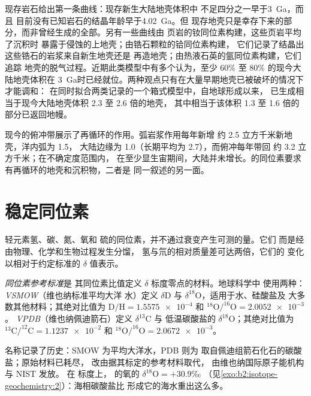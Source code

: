 现存岩石给出第一条曲线：现存新生大陆地壳体积中
不足四分之一早于\qty{3}{Ga}，而且
目前没有已知岩石的结晶年龄早于\qty{4.02}{Ga}。但
现存地壳只是幸存下来的部分，而非曾经生成的全部。另有一些曲线由
页岩的钕同位素构建，这些页岩平均了沉积时
暴露于侵蚀的上地壳；由锆石颗粒的铪同位素构建，
它们记录了结晶出这些锆石的岩浆来自新生地壳还是
再造地壳；由热液石英的氩同位素构建，它们追踪
地壳的脱气过程。近期此类模型中有多个认为，至少 60\%
至 80\% 的现今大陆地壳体积在
\qty{3}{Ga}时已经就位。两种观点只有在大量早期地壳已被破坏的情况下才能调和：
在同时拟合两类记录的一个箱式模型中，自地球形成以来，
已生成相当于现今大陆地壳体积 2.3 至 2.6 倍的地壳，
其中相当于该体积 1.3 至 1.6 倍的部分已返回地幔。

现今的俯冲带展示了再循环的作用。弧岩浆作用每年新增
约 2.5 立方千米新地壳，洋内弧为 1.5，
大陆边缘为 1.0（长期平均为 2.7），而俯冲每年带回
约 3.2 立方千米；在不确定度范围内，
在至少显生宙期间，大陆并未增长。的同位素要求有再循环的地壳和沉积物，二者是
同一叙述的另一面。

\section{稳定同位素}

轻元素氢、碳、氮、氧和
硫的同位素，并不通过衰变产生可测的量。它们
而是经由物理、化学和生物过程发生分馏，
氢与氘的相对质量差可达两倍，它们的
变化以相对于约定标准的 $\delta$ 值表示。

\begin{definition}[同位素参考标准]\label{def:b2:isotope-geochemistry:standards}
\emph{同位素参考标准}是
其同位素比值定义 $\delta$ 标度零点的材料。地球科学中
使用两种：\emph{VSMOW}（维也纳标准平均大洋
水）定义 $\delta\mathrm{D}$ 与 $\delta^{18}\mathrm{O}$，适用于水、硅酸盐及
大多数其他材料；其绝对比值为 $\mathrm{D}/\mathrm{H} =
\num{1.5575e-4}$ 和 $^{18}\mathrm{O}/^{16}\mathrm{O} = \num{2.0052e-3}$。
\emph{VPDB}（维也纳佩迪箭石）定义 $\delta^{13}\mathrm{C}$ 与
低温碳酸盐的 $\delta^{18}\mathrm{O}$；其绝对比值为
$^{13}\mathrm{C}/^{12}\mathrm{C} = \num{1.1237e-2}$ 和
$^{18}\mathrm{O}/^{16}\mathrm{O} = \num{2.0672e-3}$。
\end{definition}

名称记录了历史：SMOW 为平均大洋水，PDB 则为
取自佩迪组箭石化石的碳酸盐；原始材料已耗尽，
改由据其标定的参考材料取代，
由维也纳国际原子能机构与 NIST 发放。
在  标度上， 的氧的 $\delta^{18}\mathrm{O} = +30.9$‰
（见\cref{exo:b2:isotope-geochemistry:2}）：海相碳酸盐比
形成它的海水重出这么多。

